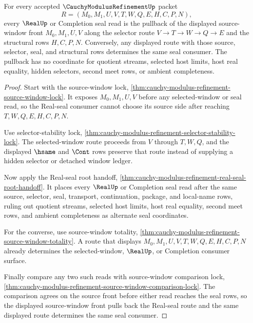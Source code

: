 \begin{theorem}
\label{thm:cauchy-modulus-refinement-source-window-real-seal-pullback}
For every accepted $\CauchyModulusRefinementUp$ packet
$$
R=(M_0,M_1,U,V,T,W,Q,E,H,C,P,N),
$$
every $\RealUp$ or Completion seal read is the pullback of the displayed source-window front $M_0,M_1,U,V$ along the selector route $V \to T \to W \to Q \to E$ and the structural rows $H,C,P,N$. Conversely, any displayed route with those source, selector, seal, and structural rows determines the same seal consumer. The pullback has no coordinate for quotient streams, selected host limits, host real equality, hidden selectors, second meet rows, or ambient completeness.
\end{theorem}
\begin{proof}
Start with the source-window lock, \autoref{thm:cauchy-modulus-refinement-source-window-lock}. It exposes $M_0,M_1,U,V$ before any selected-window or seal read, so the Real-seal consumer cannot choose its source side after reaching $T,W,Q,E,H,C,P,N$.

Use selector-stability lock, \autoref{thm:cauchy-modulus-refinement-selector-stability-lock}. The selected-window route proceeds from $V$ through $T,W,Q$, and the displayed $\hsame$ and $\Cont$ rows preserve that route instead of supplying a hidden selector or detached window ledger.

Now apply the Real-seal root handoff, \autoref{thm:cauchy-modulus-refinement-real-seal-root-handoff}. It places every $\RealUp$ or Completion seal read after the same source, selector, seal, transport, continuation, package, and local-name rows, ruling out quotient streams, selected host limits, host real equality, second meet rows, and ambient completeness as alternate seal coordinates.

For the converse, use source-window totality, \autoref{thm:cauchy-modulus-refinement-source-window-totality}. A route that displays $M_0,M_1,U,V,T,W,Q,E,H,C,P,N$ already determines the selected-window, $\RealUp$, or Completion consumer surface.

Finally compare any two such reads with source-window comparison lock, \autoref{thm:cauchy-modulus-refinement-source-window-comparison-lock}. The comparison agrees on the source front before either read reaches the seal rows, so the displayed source-window front pulls back the Real-seal route and the same displayed route determines the same seal consumer.
\end{proof}

